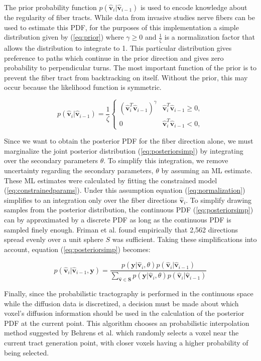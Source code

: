The prior probability function $p(\mathbf{\hat{v}}_i | \mathbf{\hat{v}}_{i-1})$ is used to encode knowledge about the regularity of fiber tracts.  While data from invasive studies nerve fibers can be used to estimate this PDF, for the purposes of this implementation a simple distribution given by (\ref{eq:prior}) where $\gamma \ge 0$ and $\frac{1}{\zeta}$ is a normalization factor that allows the distribution to integrate to 1.  This particular distribution gives preference to paths which continue in the prior direction and gives zero probability to perpendicular turns.  The most important function of the prior is to prevent the fiber tract from backtracking on itself.  Without the prior, this may occur because the likelihood function is symmetric.

\begin{equation} \label{eq:prior}
p(\mathbf{\hat{v}}_i | \mathbf{\hat{v}}_{i-1}) = 
\frac{1}{\zeta} \left\{\begin{array}{ll}
	(\mathbf{\hat{v}}_i^T\mathbf{\hat{v}}_{i-1})^\gamma & \mathbf{\hat{v}}_i^T\mathbf{\hat{v}}_{i-1} \ge 0, \\
	0 & \mathbf{\hat{v}}_i^T\mathbf{\hat{v}}_{i-1} < 0,
 \end{array} \right.
\end{equation}

Since we want to obtain the posterior PDF for the fiber direction alone, we must marginalize the joint posterior distribution (\ref{eq:posteriorsimp}) by integrating over the secondary parameters $\theta$.  To simplify this integration, we remove uncertainty regarding the secondary parameters, $\theta$ by assuming an ML estimate.  These ML estimates were calculated by fitting the constrained model (\ref{eq:constrainedparams}).  Under this assumption equation (\ref{eq:normalization}) simplifies to an integration only over the fiber directions $\mathbf{\hat{v}}_i$.  To simplify drawing samples from the posterior distribution, the continuous PDF (\ref{eq:posteriorsimp}) can by approximated by a discrete PDF as long as the continuous PDF is sampled finely enough.  Friman et al. \cite{frimanTMI06} found empirically that 2,562 directions spread evenly over a unit sphere $S$ was sufficient.  Taking these simplifications into account, equation (\ref{eq:posteriorsimp}) becomes:

\begin{equation} \label{eq:posteriordiscrete}
p(\mathbf{\hat{v}}_i|\mathbf{\hat{v}}_{i-1}, \mathbf{y}) = 
\frac{p(\mathbf{y}| \mathbf{\hat{v}}_i, \theta) p(\mathbf{\hat{v}}_i | \mathbf{\hat{v}}_{i-1})}
{\sum_{\mathbf{\hat{v}} \in \mathbf{S}} p(\mathbf{y}| \mathbf{\hat{v}}_i, \theta) p(\mathbf{\hat{v}}_i | \mathbf{\hat{v}}_{i-1})}
\end{equation}

Finally, since the probabilistic tractography is performed in the continuous space while the diffusion data is discretized, a decision must be made about which voxel's diffusion information should be used in the calculation of the posterior PDF at the current point.  This algorithm chooses an probabilistic interpolation method suggested by Behrens et al. \cite{behrensMRM03} which randomly selects a voxel near the current tract generation point, with closer voxels having a higher probability of being selected.

